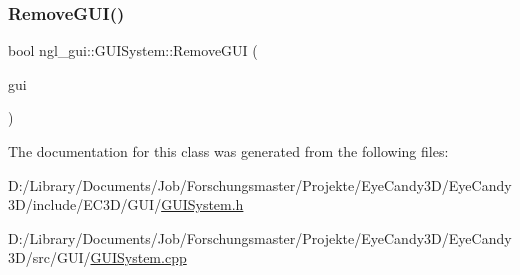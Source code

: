 \subsubsection{\texorpdfstring{Remove\+G\+U\+I()}{RemoveGUI()}}
{\footnotesize\ttfamily bool ngl\+\_\+gui\+::\+G\+U\+I\+System\+::\+Remove\+G\+UI (\begin{DoxyParamCaption}\item[{\mbox{\hyperlink{classngl__gui_1_1_g_u_i}{G\+UI}} $\ast$}]{gui }\end{DoxyParamCaption})}



The documentation for this class was generated from the following files\+:\begin{DoxyCompactItemize}
\item 
D\+:/\+Library/\+Documents/\+Job/\+Forschungsmaster/\+Projekte/\+Eye\+Candy3\+D/\+Eye\+Candy3\+D/include/\+E\+C3\+D/\+G\+U\+I/\mbox{\hyperlink{_g_u_i_system_8h}{G\+U\+I\+System.\+h}}\item 
D\+:/\+Library/\+Documents/\+Job/\+Forschungsmaster/\+Projekte/\+Eye\+Candy3\+D/\+Eye\+Candy3\+D/src/\+G\+U\+I/\mbox{\hyperlink{_g_u_i_system_8cpp}{G\+U\+I\+System.\+cpp}}\end{DoxyCompactItemize}
